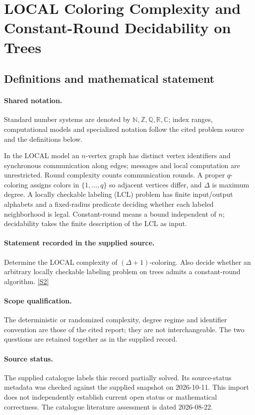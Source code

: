 \documentclass[11pt]{article}
\newcommand{\sref}[2]{\hyperlink{source:#1:#2}{[S#2]}}
\begin{document}
\section{LOCAL Coloring Complexity and Constant-Round Decidability on Trees}\label{statement}

\subsection{Definitions and mathematical statement}

\paragraph{Shared notation.}Standard number systems are denoted by $\mathbb N,\mathbb Z,\mathbb Q,\mathbb R,\mathbb C$; index ranges, computational models and specialized notation follow the cited problem source and the definitions below.


In the LOCAL model an $n$-vertex graph has distinct vertex identifiers and synchronous communication along edges; messages and local computation are unrestricted. Round complexity counts communication rounds. A proper $q$-coloring assigns colors in $\{1,\ldots,q\}$ so adjacent vertices differ, and $\Delta$ is maximum degree. A locally checkable labeling (LCL) problem has finite input/output alphabets and a fixed-radius predicate deciding whether each labeled neighborhood is legal. Constant-round means a bound independent of $n$; decidability takes the finite description of the LCL as input.
\paragraph{Statement recorded in the supplied source.}
Determine the LOCAL complexity of $(\Delta+1)$-coloring. Also decide whether an arbitrary locally checkable labeling problem on trees admits a constant-round algorithm. \sref{statement}{2}
\paragraph{Scope qualification.}
The deterministic or randomized complexity, degree regime and identifier convention are those of the cited report; they are not interchangeable. The two questions are retained together as in the supplied record.
\paragraph{Source status.}
The supplied catalogue labels this record partially solved. Its source-status metadata was checked against the supplied snapshot on 2026-10-11. This import does not independently establish current open status or mathematical correctness. The catalogue literature assessment is dated 2026-08-22.
\end{document}
